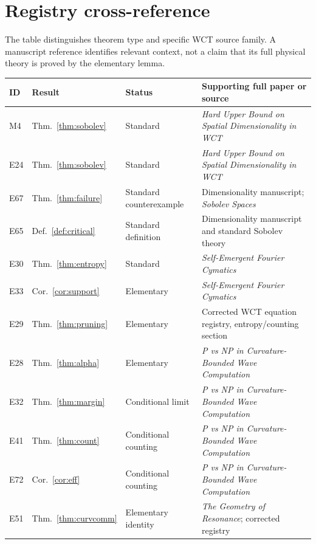\documentclass[11pt,letterpaper]{article}
\theoremstyle{definition}
\theoremstyle{remark}
\begin{document}
\section{Registry cross-reference}
The table distinguishes theorem type and specific WCT source family.
A manuscript reference identifies relevant context, not a claim that
its full physical theory is proved by the elementary lemma.
\footnotesize
\setlength{\tabcolsep}{4pt}
\renewcommand{\arraystretch}{1.20}
\begin{longtable}{@{}p{1.0cm}p{1.92cm}p{3.05cm}p{8.0cm}@{}}
\toprule
\textbf{ID} & \textbf{Result} & \textbf{Status} & \textbf{Supporting full paper or source}\\
\midrule\endhead
M4 & Thm.~\ref{thm:sobolev} & Standard & \emph{Hard Upper Bound on Spatial Dimensionality in WCT} \cite{dimensionality} \\
E24 & Thm.~\ref{thm:sobolev} & Standard & \emph{Hard Upper Bound on Spatial Dimensionality in WCT} \cite{dimensionality} \\
E67 & Thm.~\ref{thm:failure} & Standard counterexample & Dimensionality manuscript; \emph{Sobolev Spaces} \cite{dimensionality,adamsfournier} \\
E65 & Def.~\ref{def:critical} & Standard definition & Dimensionality manuscript and standard Sobolev theory \cite{dimensionality,adamsfournier} \\
E30 & Thm.~\ref{thm:entropy} & Standard & \emph{Self-Emergent Fourier Cymatics} \cite{cymatics} \\
E33 & Cor.~\ref{cor:support} & Elementary & \emph{Self-Emergent Fourier Cymatics} \cite{cymatics} \\
E29 & Thm.~\ref{thm:pruning} & Elementary & Corrected WCT equation registry, entropy/counting section \cite{registry} \\
E28 & Thm.~\ref{thm:alpha} & Elementary & \emph{P vs NP in Curvature-Bounded Wave Computation} \cite{complexity} \\
E32 & Thm.~\ref{thm:margin} & Conditional limit & \emph{P vs NP in Curvature-Bounded Wave Computation} \cite{complexity} \\
E41 & Thm.~\ref{thm:count} & Conditional counting & \emph{P vs NP in Curvature-Bounded Wave Computation} \cite{complexity} \\
E72 & Cor.~\ref{cor:eff} & Conditional counting & \emph{P vs NP in Curvature-Bounded Wave Computation} \cite{complexity} \\
E51 & Thm.~\ref{thm:curvcomm} & Elementary identity & \emph{The Geometry of Resonance}; corrected registry \cite{geometry,registry} \\

\end{longtable}
\end{document}
